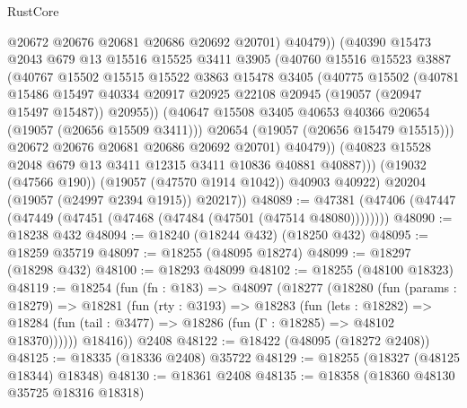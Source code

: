 \begin{lexlean}{RustCore}
\begin{coremodule}
                      @20672
                      @20676
                      @20681
                      @20686
                      @20692
                      @20701)
                    @40479))
                (@40390
                  @15473
                  @2043
                  @679
                  @13
                  @15516
                  @15525
                  @3411
                  @3905
                  (@40760
                    @15516
                    @15523
                    @3887
                    (@40767
                      @15502
                      @15515
                      @15522
                      @3863
                      @15478
                      @3405
                      (@40775
                        @15502
                        (@40781
                          @15486
                          @15497
                          @40334
                          @20917
                          @20925
                          @22108
                          @20945
                          (@19057 (@20947 @15497 @15487))
                          @20955))
                      (@40647 @15508 @3405 @40653 @40366 @20654 (@19057 (@20656 @15509 @3411)))
                      @20654
                      (@19057 (@20656 @15479 @15515)))
                    @20672
                    @20676
                    @20681
                    @20686
                    @20692
                    @20701)
                  @40479))
              (@40823 @15528 @2048 @679 @13 @3411 @12315 @3411 @10836 @40881 @40887)))
          (@19032 (@47566 @190))
          (@19057 (@47570 @1914 @1042))
          @40903
          @40922)
        @20204
        (@19057 (@24997 @2394 @1915))
        @20217))
@48089 := @47381 (@47406 (@47447 (@47449 (@47451 (@47468 (@47484 (@47501 (@47514 @48080))))))))
@48090 := @18238 @432
@48094 := @18240 (@18244 @432) (@18250 @432)
@48095 := @18259 @35719
@48097 := @18255 (@48095 @18274)
@48099 := @18297 (@18298 @432)
@48100 := @18293 @48099
@48102 := @18255 (@48100 @18323)
@48119 := @18254
    (fun (fn : @183) =>
    @48097
      (@18277
        (@18280
          (fun (params : @18279) =>
          @18281
            (fun (rty : @3193) =>
            @18283
              (fun (lets : @18282) =>
              @18284 (fun (tail : @3477) => @18286 (fun (Γ : @18285) => @48102 @18370))))))
        @18416))
    @2408
@48122 := @18422 (@48095 (@18272 @2408))
@48125 := @18335 (@18336 @2408) @35722
@48129 := @18255 (@18327 (@48125 @18344) @18348)
@48130 := @18361 @2408
@48135 := @18358 (@18360 @48130 @35725 @18316 @18318)

\end{coremodule}
\end{lexlean}

